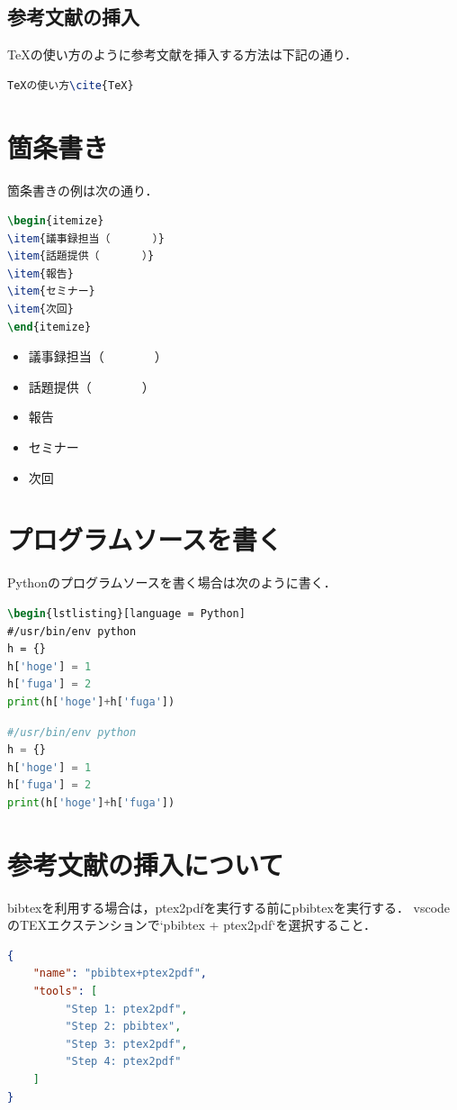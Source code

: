 \documentclass[11pt,a4paper]{jsarticle}
\begin{document}
\subsection{参考文献の挿入}
TeXの使い方\cite{TeX}のように参考文献を挿入する方法は下記の通り．
\begin{lstlisting}[language = TeX]
TeXの使い方\cite{TeX}
\end{lstlisting}

\section{箇条書き}
箇条書きの例は次の通り．
\begin{lstlisting}[language = TeX]
\begin{itemize}
\item{議事録担当（　　　　）}
\item{話題提供（　　　　）}
\item{報告}
\item{セミナー}
\item{次回}
\end{itemize}
\end{lstlisting}

\begin{itemize}
\item{議事録担当（　　　　）}
\item{話題提供（　　　　）}
\item{報告}
\item{セミナー}
\item{次回}
\end{itemize}
%

\section{プログラムソースを書く}
Pythonのプログラムソースを書く場合は次のように書く．
\begin{lstlisting}[language = TeX]
\begin{lstlisting}[language = Python]
#/usr/bin/env python
h = {}
h['hoge'] = 1
h['fuga'] = 2
print(h['hoge']+h['fuga'])
\end{lstlisting}
\begin{lstlisting}[language = Python]
#/usr/bin/env python
h = {}
h['hoge'] = 1
h['fuga'] = 2
print(h['hoge']+h['fuga'])
\end{lstlisting}

\section{参考文献の挿入について}
bibtexを利用する場合は，ptex2pdfを実行する前にpbibtexを実行する．
vscodeのTEXエクステンションで`pbibtex + ptex2pdf`を選択すること．
\begin{lstlisting}[language = json]
{
    "name": "pbibtex+ptex2pdf",
    "tools": [
         "Step 1: ptex2pdf",
         "Step 2: pbibtex",
         "Step 3: ptex2pdf",
         "Step 4: ptex2pdf"
    ]
}
\end{lstlisting}




\end{document}
